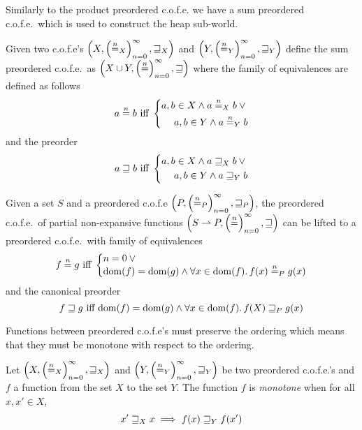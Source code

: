 \begin{jversion}
Similarly to the product preordered c.o.f.e. we have a sum preordered c.o.f.e.\ which is used to construct the heap sub-world.
\begin{lemma}
  Given two c.o.f.e's $\left(X, \left(\nequal_X\right)_{n=0}^{\infty}, \future_X \right)$ and $\left(Y, \left(\nequal_Y\right)_{n=0}^{\infty}, \future_Y \right)$ define the sum preordered c.o.f.e.\ as $\left(X \cup Y, \left(\nequal\right)_{n=0}^{\infty}, \future \right)$
  where the family of equivalences are defined as follows
  \[
    a \nequal b \text{ iff }
    \left\{
      \begin{aligned}
        a,b \in X \wedge a \nequal_X b \vee{} \\
        a,b \in Y \wedge a \nequal_Y b
      \end{aligned}
    \right.
  \]
  and the preorder
  \[
    a \future b \text{ iff }
    \left\{
      \begin{aligned}
        a,b \in X \wedge a \future_X b \vee{} \\
        a,b \in Y \wedge a \future_Y b
      \end{aligned}
    \right.
  \]
\end{lemma}
\begin{lemma}
  Given a set $S$ and a preordered c.o.f.e $\left( P, \left( \nequal_P \right)_{n=0}^{\infty}, \future_P \right)$, the preordered c.o.f.e.\ of partial non-expansive functions $\left(S \parfun P, \left( \nequal  \right)_{n=0}^\infty,\future\right)$ can be lifted to a preordered c.o.f.e.\ with family of equivalences
  \[
     f \nequal g \text{ iff } 
     \left\{
       \arraycolsep=0pt \array{l}
         n = 0 \vee{} \\
         \dom(f) = \dom(g) \wedge \forall x \in \dom(f) \ldotp f(x) \nequal_P g(x)
       \endarray
     \right.
  \]
  and the canonical preorder
  \[
    f \future g \text{ iff } \dom(f) = \dom(g) \wedge \forall x \in \dom(f) \ldotp f(X) \future_P g(x)
  \]
\end{lemma}

Functions between preordered c.o.f.e's must preserve the ordering which means that they must be monotone with respect to the ordering.
\begin{definition}
  \label{def:monotone-preordered-cofe}
  Let $\left(X,\left(\nequal[n]_X\right)_{n=0}^{\infty},\future_X \right)$ and $\left(Y,\left(\nequal[n]_Y\right)_{n=0}^{\infty} ,\future_Y\right)$ be two preordered c.o.f.e.'s and $f$ a function from the set $X$ to the set $Y$.
  The function $f$ is \emph{monotone} when for all $x, x' \in X$,
\[
  x' \future_X x \implies f(x) \future_Y f(x')
\]
\end{definition}


\end{jversion}
